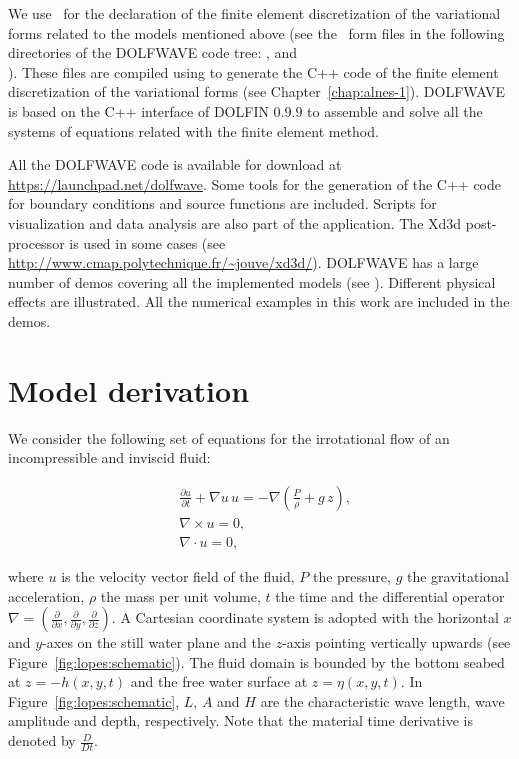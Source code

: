 We use \ufl\ for the declaration of the finite element discretization
of the variational forms related to the models mentioned above (see
the \ufl\ form files in the following directories of the DOLFWAVE code
tree: ,  and\\
).  These files are compiled using \ffc to
generate the C++ code of the finite element discretization of the
variational forms (see Chapter~\ref{chap:alnes-1}).  DOLFWAVE is based
on the C++ interface of DOLFIN $0.9.9$ to assemble and solve all the
systems of equations related with the finite element method.

All the DOLFWAVE code is available for download at
\url{https://launchpad.net/dolfwave}. Some tools for the generation of
the C++ code for boundary conditions and source functions are
included. Scripts for visualization and data analysis are also part of
the application. The Xd3d post-processor is used in some cases (see
\url{http://www.cmap.polytechnique.fr/~jouve/xd3d/}).  DOLFWAVE
has a large number of demos covering all the implemented models (see
). Different physical effects are illustrated.  All
the numerical examples in this work are included in the demos.


\section{Model derivation}
\label{sec:lopes:modelderivation}

We consider the following set of equations for the irrotational flow
of an incompressible and inviscid fluid:

\begin{subequations}\label{eq:lopes:euler}
\begin{align}
&\displaystyle\frac{\partial u}{\partial t}+\nabla u \,
  u=-\nabla\left(\frac{P}{\rho} +g\,
  z\right),\label{eq:lopes:euler-a} \\ &\nabla\times
  u={0},\label{eq:lopes:euler-b}
  \\ &\nabla\cdot{u}=0,\label{eq:lopes:euler-c}
\end{align}
\end{subequations}

where $u$ is the velocity vector field of the fluid, $P$ the pressure,
$g$ the gravitational acceleration, $\rho$ the mass per unit volume,
$t$ the time and the differential operator
$\nabla=\left(\frac{\partial }{\partial x},\frac{\partial }{\partial
y},\frac{\partial }{\partial z}\right).$ A Cartesian coordinate system
is adopted with the horizontal $x$ and $y$-axes on the still water
plane and the $z$-axis pointing vertically upwards (see
Figure~\ref{fig:lopes:schematic}).  The fluid domain is bounded by the
bottom seabed at $z=-h(x,y,t)$ and the free water surface at
$z=\eta(x,y,t)$.  In Figure~\ref{fig:lopes:schematic}, $L$, $A$ and
$H$ are the characteristic wave length, wave amplitude and depth,
respectively. Note that the material time derivative is denoted by
$\frac{D}{D t}$.

